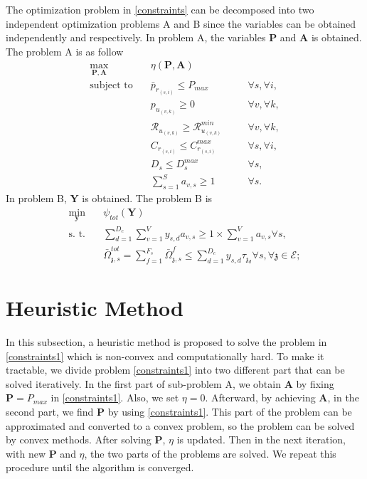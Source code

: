 \documentclass[conference]{IEEEtran}
\begin{document}
The optimization problem in \eqref{constraints} can be decomposed into two independent optimization problems A and B since the variables can be obtained independently and respectively. In problem A,
the variables $\boldsymbol{P}$ and $ \boldsymbol{A}$ is obtained. The problem A is as follow
\begin{subequations}
\begin{alignat}{4}
\max\limits_{\boldsymbol{P}, \boldsymbol{A} }   \quad &   \eta(\boldsymbol{P},\boldsymbol{A})\\
\text{subject to} \quad  & \bar{p}_{r_{(s,i)}} \leq P_{max} && \quad \forall s, \forall i,   \\
&p_{u_{(v,k)}}  \geq 0  &&\quad \forall v, \forall k, \\
&\mathcal{R}_{u_{(v,k)}} \geq  \mathcal{R}_{u_{(v,k)}}^{min} && \quad \forall v, \forall k, \\
&C_{r_{(s,i)}} \leq C_{r_{(s,i)}}^{max}  &&\quad \forall s, \forall i,\label{cc14} \\
&D_{s} \leq D_{s}^{max}  &&\quad \forall s, \label{cc15} \\
& \textstyle  \sum_{s=1}^{S}a_{v,s} \geq 1 &&\quad \forall s.
\end{alignat}
\label{constraints1}
\end{subequations}
In problem B, $ \boldsymbol{Y}$ is obtained. The problem B is
\begin{subequations}
\begin{alignat}{4}
\min\limits_{\boldsymbol{y} }   \quad &   \psi_{tot}(\boldsymbol{Y})\\
\text{s. t.} \quad & \textstyle \sum_{d=1}^{D_c}\sum_{v=1}^{V}y_{s,d}a_{v,s} \geq 1\times\sum_{v=1}^{V}a_{v,s} \forall s, \\
 &\textstyle  \bar{\Omega}_{\mathfrak{z},s}^{tot} = \sum_{f=1}^{F_s}\bar{\Omega}_{\mathfrak{z},s}^f \leq  \sum_{d=1}^{D_c} y_{s,d} \tau_{\mathfrak{z}_d}
\forall s, \forall \mathfrak{z}\in \mathcal{E};  \label{eqomega}
\end{alignat}
\label{constraints2}
\end{subequations}
\section{Heuristic Method}\label{proposedmethod}
In this subsection, a heuristic  method is proposed to solve the problem in \eqref{constraints1} which is non-convex and computationally hard. To make it tractable, we divide problem \eqref{constraints1} into
two different part that can be solved iteratively.
In the first part of sub-problem A, we obtain $\boldsymbol{A}$ by fixing $\boldsymbol{P} = P_{max}$ in \eqref{constraints1}. Also, we set $\eta = 0$. Afterward, by achieving $\boldsymbol{A}$, in the second part, we find $\boldsymbol{P}$ by using \eqref{constraints1}. This part of the problem can be approximated and converted to a convex problem, so the problem can be solved by convex methods. After solving $\boldsymbol{P}$, $\eta$ is updated. Then in the next iteration, with new $\boldsymbol{P}$
and $\eta$, the two parts of the problems are solved. We repeat this procedure until the algorithm is converged.
\end{document}
